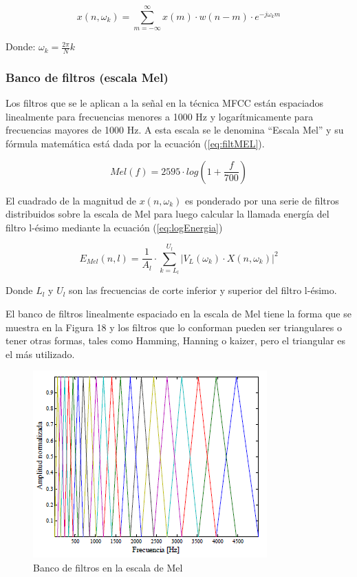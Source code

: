 \begin{equation}\label{eq:fftCorto}
	x(n,\omega_k)=\sum_{m=-\infty}^{\infty}{x(m)\cdot w(n-m)\cdot e^{-j\omega_km}}
\end{equation}

Donde: $\omega_k=\frac{2\pi}{N}k$ 

\subsubsection*{Banco de filtros (escala Mel)}

Los filtros que se le aplican a la señal en la técnica MFCC están espaciados linealmente para frecuencias menores a 1000 Hz y logarítmicamente para frecuencias mayores de 1000 Hz. A esta escala se le denomina “Escala Mel” y su fórmula matemática está dada por la ecuación (\ref{eq:filtMEL}).

\begin{equation}\label{eq:filtMEL}
	Mel(f)=2595\cdot log(1+\frac{f}{700})
\end{equation}

El cuadrado de la magnitud de $x(n,\omega_k )$ es ponderado por una serie de filtros distribuidos sobre la escala de Mel para luego calcular la llamada energía del filtro l-ésimo mediante la ecuación (\ref{eq:logEnergia})

\begin{equation}\label{eq:logEnergia}
	E_{Mel}(n,l)=\frac{1}{A_l}\cdot \sum_{k=L_l}^{U_l}{|V_L(\omega_k)\cdot X(n,\omega_k)|^2}
\end{equation}

Donde $L_l$  y $U_l$ son las frecuencias de corte inferior y superior del filtro l-ésimo.

El banco de filtros linealmente espaciado en la escala de Mel tiene la forma que se muestra en la Figura 18 y los filtros que lo conforman pueden ser triangulares o tener otras formas, tales como Hamming, Hanning o kaizer, pero el triangular es el más utilizado.

\begin{figure}[H]
	\centering
	\includegraphics[width=0.6\linewidth]{figures/bancoFiltros}
	\caption{Banco de filtros en la escala de Mel}
	\label{fig:bancoFiltros}
\end{figure}

